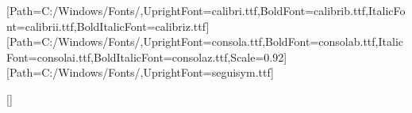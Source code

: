 \usepackage{fontspec}
\setmainfont{Calibri}[Path=C:/Windows/Fonts/,UprightFont=calibri.ttf,BoldFont=calibrib.ttf,ItalicFont=calibrii.ttf,BoldItalicFont=calibriz.ttf]
\setmonofont{Consolas}[Path=C:/Windows/Fonts/,UprightFont=consola.ttf,BoldFont=consolab.ttf,ItalicFont=consolai.ttf,BoldItalicFont=consolaz.ttf,Scale=0.92]
\newfontfamily{}[Path=C:/Windows/Fonts/,UprightFont=seguisym.ttf]
\usepackage[most]{tcolorbox}
\usepackage{adjustbox,xcolor,titlesec,enumitem,needspace,fancyhdr,booktabs,array}
\renewcommand{\arraystretch}{1.3}
\setlength{\parindent}{0pt}
\setlength{\parskip}{2pt}
\providecommand{\tightlist}{\setlength{\itemsep}{0pt}\setlength{\parskip}{0pt}}


\newcommand{\zeitbadge}[1]{{\small\normalfont\color{black!65}{\symfont ⏱}\,#1}}
\newcommand{\zeit}[1]{\texorpdfstring{\hfill\zeitbadge{#1}}{}}

[{\vspace{-0.6ex}\color{cUebung}\titlerule[1.6pt]}]
\titlespacing*{\section}{0pt}{30pt}{8pt}
\titlespacing*{\subsection}{0pt}{20pt}{4pt}
\titleformat{\subsubsection}{\bfseries\color{black!70}}{}{0pt}{}

